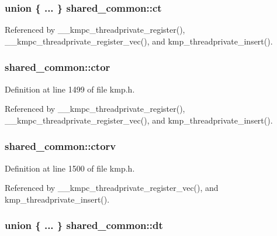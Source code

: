 \hypertarget{structshared__common_ac98f8d219b58bb8cb289d896c2328e21}{
\subsubsection[{ct}]{\setlength{\rightskip}{0pt plus 5cm}union \{ ... \}   shared\-\_\-common\-::ct}}\label{structshared__common_ac98f8d219b58bb8cb289d896c2328e21}


Referenced by \-\_\-\-\_\-kmpc\-\_\-threadprivate\-\_\-register(), \-\_\-\-\_\-kmpc\-\_\-threadprivate\-\_\-register\-\_\-vec(), and kmp\-\_\-threadprivate\-\_\-insert().

\hypertarget{structshared__common_a26bff742774584fe18d5bca4b432b1ed}{
\subsubsection[{ctor}]{ shared\-\_\-common\-::ctor}}\label{structshared__common_a26bff742774584fe18d5bca4b432b1ed}


Definition at line 1499 of file kmp.\-h.



Referenced by \-\_\-\-\_\-kmpc\-\_\-threadprivate\-\_\-register(), \-\_\-\-\_\-kmpc\-\_\-threadprivate\-\_\-register\-\_\-vec(), and kmp\-\_\-threadprivate\-\_\-insert().

\hypertarget{structshared__common_aa82b661dba8988acd64a0d185851efce}{
\subsubsection[{ctorv}]{ shared\-\_\-common\-::ctorv}}\label{structshared__common_aa82b661dba8988acd64a0d185851efce}


Definition at line 1500 of file kmp.\-h.



Referenced by \-\_\-\-\_\-kmpc\-\_\-threadprivate\-\_\-register\-\_\-vec(), and kmp\-\_\-threadprivate\-\_\-insert().

\hypertarget{structshared__common_ae1c3740671335275599c29df1f6d71d1}{
\subsubsection[{dt}]{\setlength{\rightskip}{0pt plus 5cm}union \{ ... \}   shared\-\_\-common\-::dt}}\label{structshared__common_ae1c3740671335275599c29df1f6d71d1}


